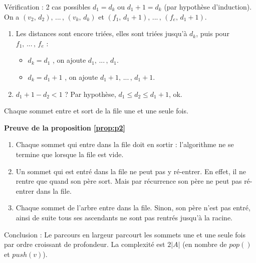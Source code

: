 \vspace{1cm}
Vérification : 2 cas possibles $d_{1} = d_{k}$ ou $d_{1} + 1 = d_{k}$ (par hypothèse d'induction). On a  $(v_{2},\, d_{2}),\, ...\, ,\,  (v_{k},\, d_{k})$ et $(f_{1},\, d_{1} + 1),\, ...\, ,\, (f_{e},\, d_{1} + 1)$.

\begin{enumerate}

\item Les distances sont encore triées, elles sont triées jusqu'à $d_{k}$, puis pour $f_{1},\, ...\,,\, f_{e}$ : 

\begin{minipage}[t]{\textwidth}
	\begin{itemize}
		\item $d_{k} = d_{1}$ , on ajoute $d_{1},\, ...\,,\, d_{1}$.
		\item $d_{k} = d_{1} + 1$ , on ajoute $d_{1} + 1,\, ... \,,\, d_{1} + 1$. 
	\end{itemize}
\end{minipage}

\item $d_{1} + 1 - d_{2} < 1$ ? Par hypothèse, $d_{1} \leq d_{2} \leq d_{1} + 1$, ok.

\end{enumerate}

\begin{proposition}\label{prop:p2}
Chaque sommet entre et sort de la file une et une seule fois.
\end{proposition}

\textbf{\sffamily\small Preuve de la proposition \ref{prop:p2}}\\
\begin{enumerate}
\item Chaque sommet qui entre dans la file doit en sortir : l'algorithme ne se termine que lorsque la file est vide.

\item Un sommet qui est entré dans la file ne peut pas y ré-entrer. En effet, il ne rentre que quand son père sort. Mais par récurrence son père ne peut pas ré-entrer dans la file.

\item Chaque sommet de l'arbre entre dans la file. Sinon, son père n'est pas entré, ainsi de suite tous ses ascendants ne sont pas rentrés jusqu'à la racine.
\end{enumerate}

\textcolor{ocre}{Conclusion} : Le parcours en largeur parcourt les sommets une et une seule fois par ordre croissant de profondeur. La complexité est $2 \vert A \vert$ (en nombre de $pop()$ et $push(v)$).


